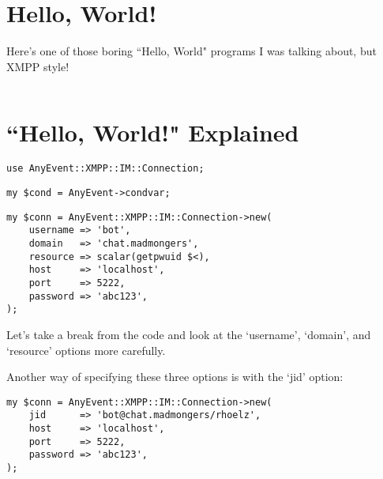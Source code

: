 \section{Hello, World!}

\pause

Here's one of those boring ``Hello, World" programs I was talking about, but XMPP style!

\begin{shaded}
\inputminted{perl}{examples/hello.pl}
\end{shaded}

\newpage
\section{``Hello, World!" Explained}

\pause

\begin{shaded}
\begin{verbatim}
use AnyEvent::XMPP::IM::Connection;
\end{verbatim}
\end{shaded}

\pause
\begin{shaded}
\begin{verbatim}
my $cond = AnyEvent->condvar;
\end{verbatim}
\end{shaded}

\pause
\begin{shaded}
\begin{verbatim}
my $conn = AnyEvent::XMPP::IM::Connection->new(
    username => 'bot',
    domain   => 'chat.madmongers',
    resource => scalar(getpwuid $<),
    host     => 'localhost',
    port     => 5222,
    password => 'abc123',
);
\end{verbatim}
\end{shaded}

\pause
Let's take a break from the code and look at the `username', `domain', and
`resource' options more carefully.

\pause
Another way of specifying these three options is with the `jid' option:

\begin{shaded}
\begin{verbatim}
my $conn = AnyEvent::XMPP::IM::Connection->new(
    jid      => 'bot@chat.madmongers/rhoelz',
    host     => 'localhost',
    port     => 5222,
    password => 'abc123',
);
\end{verbatim}
\end{shaded}

